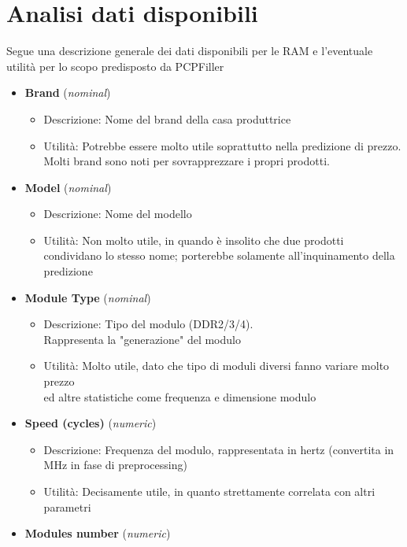 \documentclass[12pt]{report}
\begin{document}
\newpage
\section{Analisi dati disponibili}

Segue una descrizione generale dei dati disponibili per le RAM e l'eventuale utilità per lo scopo predisposto da PCPFiller
\begin{itemize}
	\item \textbf{Brand} (\textit{nominal})
		\begin{itemize}
			\item Descrizione: Nome del brand della casa produttrice
			\item Utilità: Potrebbe essere molto utile soprattutto nella predizione di prezzo. Molti brand sono noti per sovrapprezzare i propri prodotti.
		\end{itemize}
	\item \textbf{Model} (\textit{nominal})
		\begin{itemize}
			\item Descrizione: Nome del modello
			\item Utilità: Non molto utile, in quando è insolito che due prodotti condividano lo stesso nome; porterebbe solamente all'inquinamento della predizione
		\end{itemize}
	\item \textbf{Module Type} (\textit{nominal})
		\begin{itemize}
			\item Descrizione: Tipo del modulo (DDR2/3/4).\\Rappresenta la "generazione" del modulo
			\item Utilità: Molto utile, dato che tipo di moduli diversi fanno variare molto prezzo\\ ed altre statistiche come frequenza e dimensione modulo
		\end{itemize}
	\item \textbf{Speed (cycles)} (\textit{numeric})
		\begin{itemize}
			\item Descrizione: Frequenza del modulo, rappresentata in hertz (convertita in MHz in fase di preprocessing)
			\item Utilità: Decisamente utile, in quanto strettamente correlata con altri parametri
		\end{itemize}
	\item \textbf{Modules number} (\textit{numeric})
		\begin{itemize}

\end{itemize}
\end{itemize}
\end{document}

